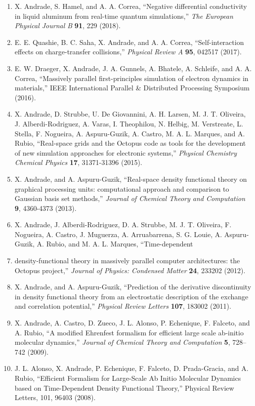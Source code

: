 \begin{enumerate}
    \item X. Andrade, S. Hamel, and A. A. Correa, “Negative differential conductivity in liquid aluminum from real-time quantum simulations,” {\it The European Physical Journal B} {\bf 91}, 229 (2018).
    \item E. E. Quashie, B. C. Saha, X. Andrade, and A. A. Correa, “Self-interaction effects on charge-transfer collisions,” {\it Physical Review A} {\bf 95}, 042517 (2017).
    \item E. W. Draeger, X. Andrade, J. A. Gunnels, A. Bhatele, A. Schleife, and A. A. Correa, “Massively parallel first-principles simulation of electron dynamics in materials,” IEEE International Parallel \& Distributed Processing Symposium (2016).
    \item X. Andrade, D. Strubbe, U. De Giovannini, A. H. Larsen, M. J. T. Oliveira, J. Alberdi-Rodriguez, A. Varas, I. Theophilou, N. Helbig, M. Verstreate, L. Stella, F. Nogueira, A. Aspuru-Guzik, A. Castro, M. A. L. Marques, and A. Rubio, “Real-space grids and the Octopus code as tools for the development of new simulation approaches for electronic systems,” {\it Physical Chemistry Chemical Physics} {\bf 17}, 31371-31396 (2015). 
    \item X. Andrade, and A. Aspuru-Guzik, “Real-space density functional theory on graphical processing units: computational approach and comparison to Gaussian basis set methods,” {\it Journal of Chemical Theory and Computation} {\bf 9}, 4360-4373 (2013).
    \item X. Andrade, J. Alberdi-Rodriguez, D. A. Strubbe, M. J. T. Oliveira, F. Nogueira, A. Castro, J. Muguerza, A. Arruabarrena, S. G. Louie, A. Aspuru-Guzik, A. Rubio, and M. A. L. Marques, “Time-dependent
    \item density-functional theory in massively parallel computer architectures: the Octopus project,” {\it Journal of Physics: Condensed Matter} {\bf 24}, 233202 (2012).
    \item X. Andrade, and A. Aspuru-Guzik, “Prediction of the derivative discontinuity in density functional theory from an electrostatic description of the exchange and correlation potential,” {\it Physical Review Letters} {\bf 107}, 183002 (2011).
    \item X. Andrade, A. Castro, D. Zueco, J. L. Alonso, P. Echenique, F. Falceto, and A. Rubio, “A modified Ehrenfest formalism for efficient large scale ab-initio molecular dynamics,” {\it Journal of Chemical Theory and Computation} {\bf 5}, 728–742 (2009).
    \item J. L. Alonso, X. Andrade, P. Echenique, F. Falceto, D. Prada-Gracia, and A. Rubio, “Efficient Formalism for Large-Scale Ab Initio Molecular Dynamics based on Time-Dependent Density Functional Theory,” Physical Review Letters, 101, 96403 (2008).
\end{enumerate}

